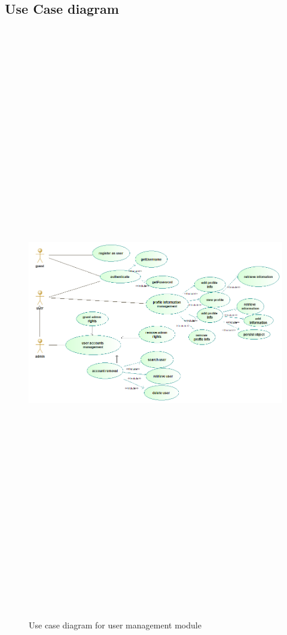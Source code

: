 \subsection{Use Case diagram}
\begin{figure}[H]
	\includegraphics[width=12cm,height=26cm,keepaspectratio]{Users/Pictures/user_use_case_diagram.png}
	\caption{Use case diagram for user management module}\label{visina8}
\end{figure}
